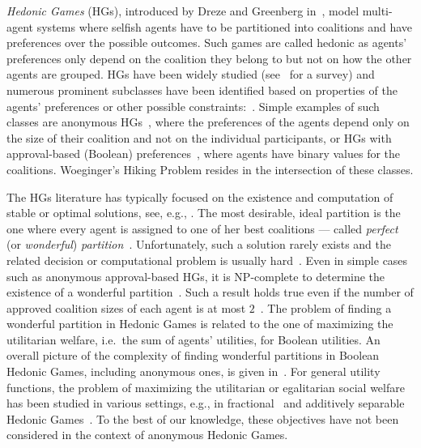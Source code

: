\documentclass[a4paper]{article}
\begin{document}
\emph{Hedonic Games} (HGs), introduced by Dreze and Greenberg in~\cite{dreze1980hedonic}, model multi-agent systems where selfish agents have to be partitioned into coalitions and have preferences over the possible outcomes. Such games are called hedonic as agents’ preferences only depend on the coalition they belong to but not on how the other agents are grouped. 
HGs have been widely studied (see~\cite{aziz2016hedonic} for a survey) and numerous prominent subclasses have been identified based on properties of the agents' preferences or other possible constraints:~\cite{ballester2004np,bogomolnaia2002stability,alcalde2004researching,olsen2009nash,Elkind09, aziz2019fractional}. 
Simple examples of such classes are anonymous HGs~\cite{banerjee2001core}, where the preferences of the agents depend only on the size of their coalition and not on the individual participants, or HGs with approval-based (Boolean) preferences~\cite{aziz2016boolean}, where agents have binary values for the coalitions. Woeginger’s Hiking Problem resides in the intersection of these classes.

The HGs literature has typically focused on the existence and computation of stable or optimal solutions, see, e.g., \cite{bogomolnaia2002stability}. The most desirable, ideal partition is the one where every agent is assigned to one of her best coalitions --- called {\em perfect} (or {\em wonderful}) {\em partition}~\cite{aziz2013pareto}. Unfortunately, such a solution rarely exists and the related decision or computational problem is usually hard~\cite{aziz2013pareto,peters2016complexity}.
Even in simple cases such as anonymous approval-based HGs, it is NP-complete to determine the existence of a wonderful partition~\cite{Darmann_journal,woeginger2013core}. 
Such a result holds true even if the number of approved coalition sizes of each agent is at most $2$~\cite{Darmann_journal}.
The problem of finding a wonderful partition in Hedonic Games is related to the one of maximizing the utilitarian welfare, i.e.\ the sum of agents' utilities, for Boolean utilities. An overall picture of the complexity of finding wonderful partitions in Boolean Hedonic Games, including anonymous ones, is given in~\cite{peters2016complexity}. For general utility functions, the problem of maximizing the utilitarian or egalitarian social welfare has been studied in various settings, e.g., in fractional~\cite{AGGMT15} and additively separable Hedonic Games~\cite{ABG16}. To the best of our knowledge, these objectives have not been considered in the context of anonymous Hedonic Games.
\end{document}
